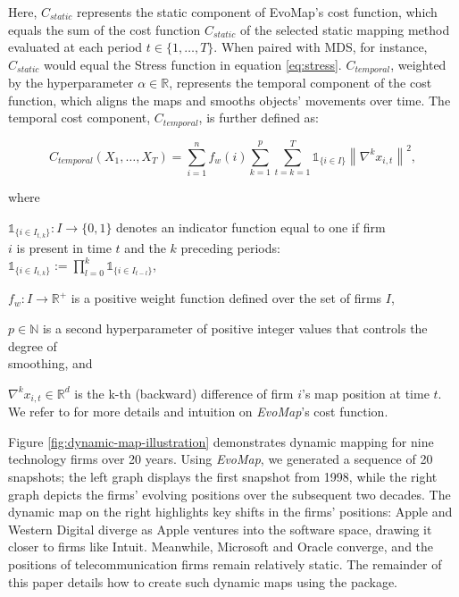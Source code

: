 \documentclass[article]{jss}
\begin{document}
Here, $C_{static}$ represents the static component of EvoMap’s cost function, which equals
the sum of the cost function $C_{static}$ of the selected static mapping method evaluated at each period
$t \in \{1, \ldots, T\}$. When paired with MDS, for instance, $C_{static}$ would equal the Stress function in
equation \ref{eq:stress}. $C_{temporal}$, weighted by the hyperparameter $\alpha \in \mathbb{R}$, represents the temporal component of the cost function, which
aligns the maps and smooths objects’ movements over time. The temporal cost component, $C_{temporal}$, is
further defined as:

\begin{equation} \label{eq:cost-temporal}
  C_{temporal}(X_1, \ldots, X_T) = \sum_{i=1}^n{f_w(i)} \sum_{k=1}^p \sum_{t=k=1}^T \mathds{1}_{\{i \in I\}} \left\| \nabla^k x_{i,t} \right\|^2,
\end{equation}

where \\
\begin{description}
  \item $\mathds{1}_{\{i \in I_{t,k}\}}: I \rightarrow \{0,1\}$ denotes an indicator function equal to one if firm \\
   $i$ is present in time $t$ and the $k$ preceding periods: \\
  $\mathds{1}_{\{i \in I_{t,k}\}} := \prod_{l=0}^k \mathds{1}_{\{i \in I_{t-l}\}}$, \\
  \item $f_w : I \rightarrow \mathbb{R}^+$ is a positive weight function defined over the set of firms $I$, \\
  \item $p \in \mathbb{N}$ is a second hyperparameter of positive integer values that controls the degree of \\ 
  smoothing, and \\
  \item $\nabla^kx_{i,t} \in \mathbb{R}^d$ is the k-th (backward) difference of firm $i$’s map position at time $t$. \\ 
  We refer to \cite{Matthe+Ringel+Skiera:2023} for more details and intuition on \emph{EvoMap}'s cost function.
\end{description}

Figure \ref{fig:dynamic-map-illustration} demonstrates dynamic mapping for nine technology firms over 20 years. 
Using \emph{EvoMap}, we generated a sequence of 20 snapshots; the left graph displays the first 
snapshot from 1998, while the right graph depicts the firms' evolving positions over the subsequent two decades. 
The dynamic map on the right highlights key shifts in the firms' positions:  
Apple and Western Digital diverge as Apple ventures into the software space, drawing it closer 
to firms like Intuit. Meanwhile, Microsoft and Oracle converge, and the positions of telecommunication firms
remain relatively static. The remainder of this paper details how to create such dynamic maps
 using the  package.
\end{document}
